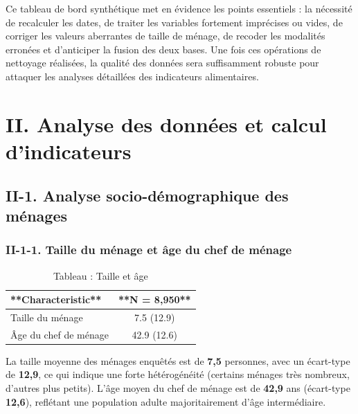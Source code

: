 \documentclass[
]{article}
\begin{document}
Ce tableau de bord synthétique met en évidence les points essentiels :
la nécessité de recalculer les dates, de traiter les variables fortement
imprécises ou vides, de corriger les valeurs aberrantes de taille de
ménage, de recoder les modalités erronées et d'anticiper la fusion des
deux bases. Une fois ces opérations de nettoyage réalisées, la qualité
des données sera suffisamment robuste pour attaquer les analyses
détaillées des indicateurs alimentaires.

\newpage

\hypertarget{ii.-analyse-des-donnuxe9es-et-calcul-dindicateurs}{%
\section{II. Analyse des données et calcul
d'indicateurs}\label{ii.-analyse-des-donnuxe9es-et-calcul-dindicateurs}}

\hypertarget{ii-1.-analyse-socio-duxe9mographique-des-muxe9nages}{%
\subsection{II-1. Analyse socio-démographique des
ménages}\label{ii-1.-analyse-socio-duxe9mographique-des-muxe9nages}}

\hypertarget{ii-1-1.-taille-du-muxe9nage-et-uxe2ge-du-chef-de-muxe9nage}{%
\subsubsection{II-1-1. Taille du ménage et âge du chef de
ménage}\label{ii-1-1.-taille-du-muxe9nage-et-uxe2ge-du-chef-de-muxe9nage}}

\begingroup\fontsize{10}{12}\selectfont

\begin{longtable}[t]{lc}
\caption{\label{tab:Taille-age}Tableau : Taille et âge}\\
\toprule
**Characteristic** & **N = 8,950**\\
\midrule
Taille du ménage & 7.5 (12.9)\\
Âge du chef de ménage & 42.9 (12.6)\\
\bottomrule
\end{longtable}
\endgroup{}

La taille moyenne des ménages enquêtés est de \textbf{7,5} personnes,
avec un écart-type de \textbf{12,9}, ce qui indique une forte
hétérogénéité (certains ménages très nombreux, d'autres plus petits).
L'âge moyen du chef de ménage est de \textbf{42,9} ans (écart-type
\textbf{12,6}), reflétant une population adulte majoritairement d'âge
intermédiaire.
\end{document}
